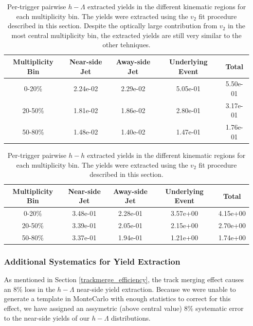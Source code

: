 \documentclass[ALICE,manyauthors]{ALICE_analysis_notes}
\begin{document}
\begin{table}[h!]
\centering
\begin{tabular}{| c | c | c | c | c | }
\hline
Multiplicity Bin & Near-side Jet & Away-side Jet & Underlying Event & Total  \\
\hline
	
0-20\% & 2.24e-02  & 2.29e-02  & 5.05e-01 & 5.50e-01 \\
20-50\% & 1.81e-02 & 1.86e-02  & 2.80e-01 & 3.17e-01 \\
50-80\% & 1.48e-02 & 1.40e-02  & 1.47e-01 & 1.76e-01 \\
	
\hline
\end{tabular}
\caption{Per-trigger pairwise $h-\Lambda$ extracted yields in the different kinematic regions for each multiplicity bin. The yields were extracted using the $v_{2}$ fit procedure described in this section. Despite the optically large contribution from $v_{2}$ in the most central multiplicity bin, the extracted yields are still very similar to the other tehniques.}
\label{h_lambda_yield_table_v2fit}
\end{table}
	
\begin{table}[h!]
\centering
\begin{tabular}{| c | c | c | c | c | }
\hline
Multiplicity Bin & Near-side Jet & Away-side Jet & Underlying Event & Total  \\
\hline

0-20\% & 3.48e-01  & 2.28e-01  & 3.57e+00 & 4.15e+00 \\
20-50\% & 3.39e-01 & 2.05e-01  & 2.15e+00 & 2.70e+00 \\
50-80\% & 3.37e-01 & 1.94e-01  & 1.21e+00 & 1.74e+00 \\

\hline
\end{tabular}
\caption{Per-trigger pairwise $h-h$ extracted yields in the different kinematic regions for each multiplicity bin. The yields were extracted using the $v_{2}$ fit procedure described in this section.}
\label{h_h_yield_table_v2fit}
\end{table}

\subsubsection{Additional Systematics for Yield Extraction}
As mentioned in Section \ref{trackmerge_efficiency}, the track merging effect causes an 8\% loss in the $h-\Lambda$ near-side yield extraction. Because we were unable to generate a template in MonteCarlo with enough statistics to correct for this effect, we have assigned an assymetric (above central value) 8\% systematic error to the near-side yields of our $h-\Lambda$ distributions.
\end{document}
